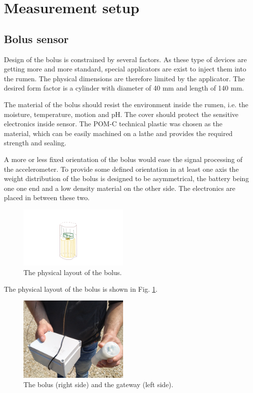 \documentclass[conference]{IEEEtran}
\begin{document}


\section{Measurement setup}

\subsection{Bolus sensor}

Design of the bolus is constrained by several factors. As these type
of devices are getting more and more standard, special applicators are
exist to inject them into the rumen. The physical dimensions are therefore
limited by the applicator. The desired form factor is a cylinder with
diameter of 40 mm and length of 140 mm.

The material of the bolus should resist the environment inside the rumen,
i.e. the moisture, temperature, motion and pH. The cover should protect
the sensitive electronics inside sensor. The POM-C technical plastic was
chosen as the material, which can be easily machined on a lathe and provides
the required strength and sealing.

A more or less fixed orientation of the bolus would ease the signal
processing of the accelerometer. To provide some defined orientation
in at least one axis the weight distribution of the bolus is designed
to be asymmetrical, the battery being one one end and a low density
material on the other side. The electronics are placed in between these two.

\begin{figure}[htbp]
\centerline{\includegraphics[width=0.48\textwidth]{fig/bolus-physical-layout.png}}
\caption{The physical layout of the bolus.}
\label{bolus-physical-layout}
\end{figure}

The physical layout of the bolus is shown in Fig. \ref{bolus-physical-layout}.


\begin{figure}[htbp]
\centerline{\includegraphics[width=0.48\textwidth]{fig/bolus_gw_photo.jpg}}
  \caption{The bolus (right side) and the gateway (left side).}
\label{bolus-gw-photo}
\end{figure}
\end{document}
